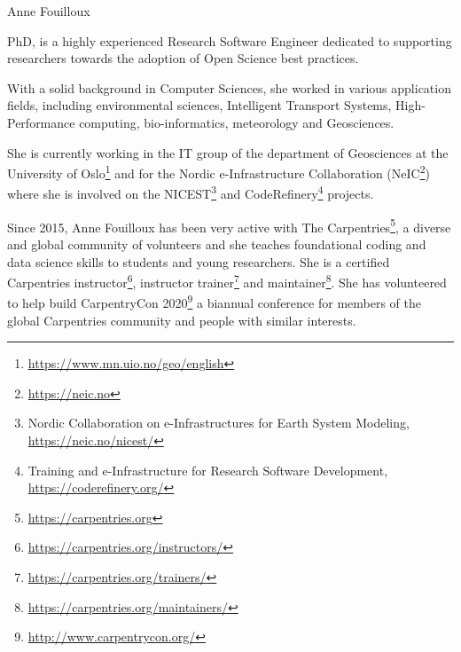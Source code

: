 \begin{participant}[type=R,PM=24,gender=female]{Anne Fouilloux}






  \medskip PhD, is a highly experienced Research Software Engineer dedicated to supporting
  researchers towards the adoption of Open Science best practices.

  With a solid background in Computer Sciences, she worked in various application fields, including environmental sciences, Intelligent Transport Systems, High-Performance computing, bio-informatics, meteorology and Geosciences.

  She is currently working in the IT group of the department of Geosciences at the University of Oslo\footnote{\url{https://www.mn.uio.no/geo/english}} and for the Nordic e-Infrastructure Collaboration (NeIC\footnote{\url{https://neic.no}}) where she is involved on the NICEST\footnote{Nordic Collaboration on e-Infrastructures for Earth System Modeling, \url{https://neic.no/nicest/}} and CodeRefinery\footnote{Training and e-Infrastructure for Research Software Development, \url{https://coderefinery.org/}} projects. 

   Since 2015, Anne Fouilloux has been very active with The Carpentries\footnote{\url{https://carpentries.org}}, a diverse and global community of volunteers and she teaches foundational coding and data science skills to students and young researchers. She is a certified Carpentries instructor\footnote{\url{https://carpentries.org/instructors/}}, instructor trainer\footnote{\url{https://carpentries.org/trainers/}} and maintainer\footnote{\url{https://carpentries.org/maintainers/}}. She has volunteered to help build CarpentryCon 2020\footnote{\url{http://www.carpentrycon.org/}} a biannual conference for members of the global Carpentries community and people with similar interests. 


\end{participant}
